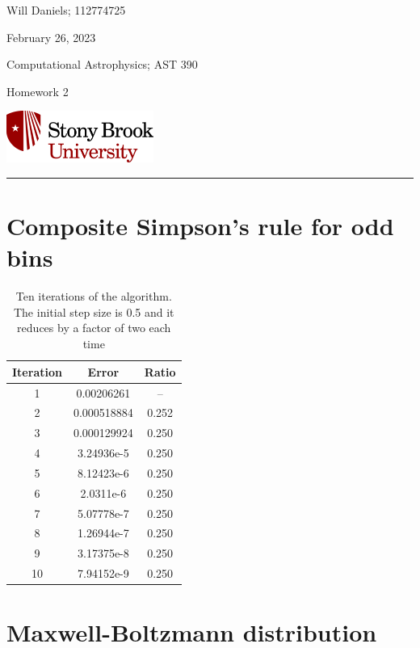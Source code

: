 \documentclass[12pt, letterpaper]{article}
\begin{document}
\noindent
\begin{minipage}{0.5\textwidth}
    Will Daniels; 112774725

    February 26, 2023

    Computational Astrophysics; AST 390

    Homework 2
\end{minipage}
%
\begin{minipage}{0.5\textwidth}
    \begin{flushright}
        \includegraphics[height = 48pt]{../../LatexAssets/SBULogoStacked}
    \end{flushright}
\end{minipage}
\noindent
\rule{\textwidth}{1pt}

\tableofcontents

\section{Composite Simpson's rule for odd bins}
\begin{table}[!b]
    \centering
    \caption{Ten iterations of the algorithm. The initial step size is 0.5 and
        it reduces by a factor of two each time}
    \label{tab:converge}
    \begin{tabular}{ c c c }
    \hline\hline
    Iteration & Error & Ratio\\
    \hline
    1 & 0.00206261 & -- \\
    2 & 0.000518884 & 0.252 \\
    3 & 0.000129924 & 0.250 \\
    4 & 3.24936e-5 & 0.250 \\
    5 & 8.12423e-6 & 0.250 \\
    6 & 2.0311e-6 & 0.250 \\
    7 & 5.07778e-7 & 0.250 \\
    8 & 1.26944e-7 & 0.250 \\
    9 & 3.17375e-8 & 0.250 \\
    10 & 7.94152e-9 & 0.250 \\
    \hline\hline
    \end{tabular}
\end{table}


\section{Maxwell-Boltzmann distribution}
\end{document}
